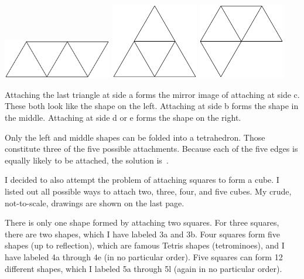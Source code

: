 \documentclass{article}
\begin{document}
\vspace{0.1in}
\begin{center}
\includegraphics[width=1.863in]{triangles3.png}
\hspace{0.25in}
\includegraphics[width=1.5in]{triangles2.png}
\hspace{0.25in}
\includegraphics[width=1.5in]{triangles4.png}
\end{center}
\vspace{0.1in}

Attaching the last triangle at side a forms the mirror image of attaching at side c.
These both look like the shape on the left.
Attaching at side b forms the shape in the middle.
Attaching at side d or e forms the shape on the right.

Only the left and middle shapes can be folded into a tetrahedron.
Those constitute three of the five possible attachments.
Because each of the five edges is equally likely to be attached, the solution is
\,.

I decided to also attempt the problem of attaching squares to form a cube.
I listed out all possible ways to attach two, three, four, and five cubes.
My crude, not-to-scale, drawings are shown on the last page.

There is only one shape formed by attaching two squares.
For three squares, there are two shapes, which I have labeled 3a and 3b.
Four squares form five shapes (up to reflection), which are famous Tetris shapes (tetrominoes), and I have labeled 4a through 4e (in no particular order).
Five squares can form 12 different shapes, which I labeled 5a through 5l (again in no particular order).
\end{document}

